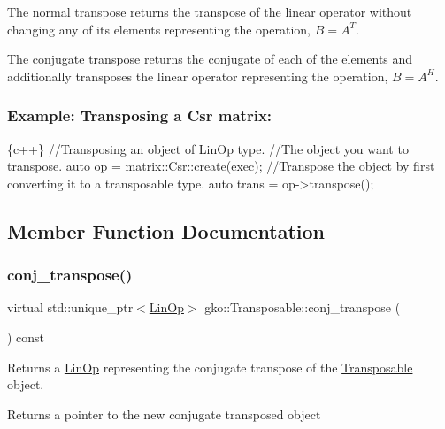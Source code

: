 The normal transpose returns the transpose of the linear operator without changing any of its elements representing the operation, $B = A^{T}$.

The conjugate transpose returns the conjugate of each of the elements and additionally transposes the linear operator representing the operation, $B = A^{H}$.

\subsubsection*{Example\+: Transposing a Csr matrix\+: }


\begin{DoxyCode}
\{c++\}
\textcolor{comment}{//Transposing an object of LinOp type.}
\textcolor{comment}{//The object you want to transpose.}
\textcolor{keyword}{auto} op = matrix::Csr::create(exec);
\textcolor{comment}{//Transpose the object by first converting it to a transposable type.}
\textcolor{keyword}{auto} trans = op->transpose();
\end{DoxyCode}
 

\subsection{Member Function Documentation}
\mbox{\label{classgko_1_1Transposable_ab41b669288740cf2a6f7bf76e875b077}} 
\subsubsection{\texorpdfstring{conj\+\_\+transpose()}{conj\_transpose()}}
{\footnotesize\ttfamily virtual std\+::unique\+\_\+ptr$<$\hyperlink{classgko_1_1LinOp}{Lin\+Op}$>$ gko\+::\+Transposable\+::conj\+\_\+transpose (\begin{DoxyParamCaption}{ }\end{DoxyParamCaption}) const\hspace{0.3cm}{\ttfamily [pure virtual]}}



Returns a \hyperlink{classgko_1_1LinOp}{Lin\+Op} representing the conjugate transpose of the \hyperlink{classgko_1_1Transposable}{Transposable} object. 

\begin{DoxyReturn}{Returns}
a pointer to the new conjugate transposed object 
\end{DoxyReturn}


